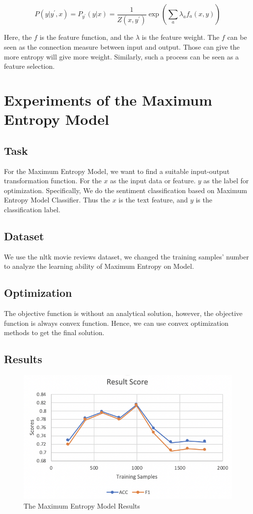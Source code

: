 \documentclass[12pt, a4paper]{article}
\begin{document}
\begin{equation}
	P\left(y | y^{\prime}, x\right)=P_{y^{\prime}}(y | x)=\frac{1}{Z\left(x, y^{\prime}\right)} \exp \left(\sum_{a} \lambda_{a} f_{a}(x, y)\right)
\end{equation}

Here, the $f$ is the feature function, and the $\lambda$ is the feature weight. The $f$ can be seen as the connection measure between input and output. Those can give the more entropy will give more weight. Similarly, such a process can be seen as a feature selection.







\section{Experiments of the Maximum Entropy Model}
\subsection{Task}
For the Maximum Entropy Model, we want to find a suitable input-output transformation function. For the $x$ as the input data or feature. $y$ as the label for optimization. Specifically, We do the sentiment classification based on Maximum Entropy Model Classifier. Thus the $x$ is the text feature, and $y$ is the classification label.
\subsection{Dataset}
We use the nltk movie reviews dataset, we changed the training samples' number to analyze the learning ability of Maximum Entropy on Model.

\subsection{Optimization}
The objective function is without an analytical solution, however, the objective function is always convex function. Hence, we can use convex optimization methods to get the final solution. 

\subsection{Results}
\begin{figure}[h]
	\centering
	\includegraphics[width=0.7\linewidth]{./image/result.jpg}
	\caption{The Maximum Entropy Model Results}
  \label{results}
\end{figure}
\end{document}
